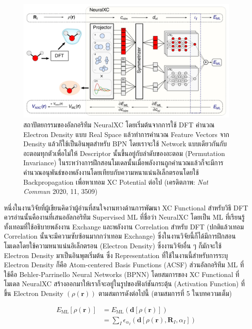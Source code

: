 \begin{figure}[H]
    \centering
    \includegraphics[width=\linewidth]{fig/neuralxc.png}
    \caption{สถาปัตยกรรมของอัลกอริทึม NeuralXC โดยเริ่มต้นจากการใช้ DFT คำนวณ Electron Density แบบ Real Space แล้วทำการคำนวณ Feature Vectors จาก Density แล้วก็ใช้เป็นอินพุตสำหรับ BPN โดยเราจะใช้ Network แบบเดียวกันกับอะตอมทุกตัวเพื่อไม่ให้ Descriptor นั้นขึ้นอยู่กับลำดับของอะตอม (Permutation Invariance) ในระหว่างการฝึกสอนโมเดลนั้นเมื่อพลังงานถูกคำนวณแล้วก็จะมีการคำนวณอนุพันธ์ของพลังงานโดยเทียบกับความหนาแน่นอิเล็กตรอนโดยใช้ Backpropagation เพื่อหาเทอม XC Potential ต่อไป (เครดิตภาพ: \textit{Nat Commun} 2020, 11, 3509)}
    \label{fig:neuralxc}
\end{figure}

หนึ่งในงานวิจัยที่ผู้เขียนคิดว่าผู้อ่านที่สนใจงานทางด้านการพัฒนา XC Functional สำหรับวิธี DFT ควรอ่านนั้นคืองานที่เสนออัลกอริทึม Supervised ML ที่ชื่อว่า NeuralXC\autocite{dick2020} โดยเป็น ML ที่เรียนรู้ทั้งเทอมที่ใช้อธิบายพลังงาน Exchange และพลังงาน Correlation สำหรับ DFT (ปกติแล้วเทอม Correlation นั้นจะมีความซับซ้อนมากกว่าเทอม Exchange) ซึ่งในงานวิจัยนี้ก็ได้มีการฝึกสอนโมเดลโดยใช้ความหนาแน่นอิเล็กตรอน (Electron Density) ซึ่งงานวิจัยอื่น ๆ ก็มักจะใช้ Electron Density มาเป็นอินพุตเริ่มต้น ซึ่ง Representation ที่ใช้ในงานนี้สำหรับการระบุ Electron Density ก็คือ Atom-centered Basis Functions (ACSF) ส่วนอัลกอริทึม ML ที่ใช้คือ Behler-Parrinello Neural Networks (BPNN) โดยสมการของ XC Functional ที่โมเดล NeuralXC สร้างออกมาให้เราก็จะอยู่ในรูปของฟังก์ชันกระตุ้น (Activation Function) ที่ขึ้น Electron Density $(\rho ({\bm{r}}))$ ตามสมการดังต่อไปนี้ (ตามสมการที่ 5 ในบทความเต็ม)

\begin{align}
    E_{\text{ML}} [\rho ({\bm{r}})] & = E_{\text{ML}}({\bm{d}}[\rho ({\bm{r}})]) \nonumber                               \\
                                    & = \sum_{I}{\epsilon}_{\alpha_{I}}(\bm{d}[\rho (\bm{r}), {\bm{R}}_{I}, \alpha_{I}])
\end{align}


